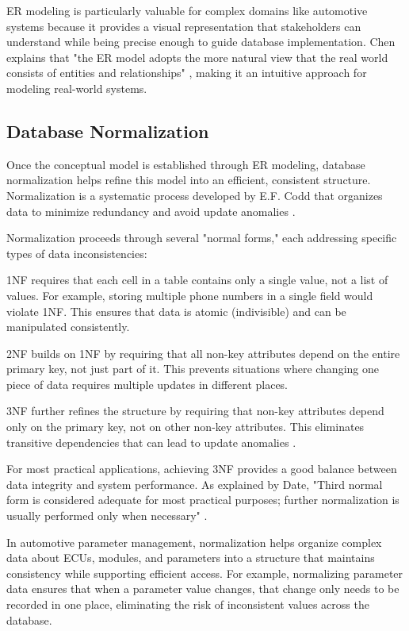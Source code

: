 \ac{ER} modeling is particularly valuable for complex domains like automotive systems because it provides a visual representation that stakeholders can understand while being precise enough to guide database implementation. Chen explains that "the \ac{ER} model adopts the more natural view that the real world consists of entities and relationships" \cite{chen1976entity}, making it an intuitive approach for modeling real-world systems.

\subsection{Database Normalization}
\label{subsec:database-normalization}

Once the conceptual model is established through \ac{ER} modeling, database normalization helps refine this model into an efficient, consistent structure. Normalization is a systematic process developed by E.F. Codd that organizes data to minimize redundancy and avoid update anomalies \cite{codd1970relational}.

Normalization proceeds through several "normal forms," each addressing specific types of data inconsistencies:

\ac{1NF} requires that each cell in a table contains only a single value, not a list of values. For example, storing multiple phone numbers in a single field would violate \ac{1NF}. This ensures that data is atomic (indivisible) and can be manipulated consistently.

\ac{2NF} builds on \ac{1NF} by requiring that all non-key attributes depend on the entire primary key, not just part of it. This prevents situations where changing one piece of data requires multiple updates in different places.

\ac{3NF} further refines the structure by requiring that non-key attributes depend only on the primary key, not on other non-key attributes. This eliminates transitive dependencies that can lead to update anomalies \cite{elmasri2015fundamentals}.

For most practical applications, achieving \ac{3NF} provides a good balance between data integrity and system performance. As explained by Date, "Third normal form is considered adequate for most practical purposes; further normalization is usually performed only when necessary" \cite{date2011sql}.

In automotive parameter management, normalization helps organize complex data about \acp{ECU}, modules, and parameters into a structure that maintains consistency while supporting efficient access. For example, normalizing parameter data ensures that when a parameter value changes, that change only needs to be recorded in one place, eliminating the risk of inconsistent values across the database.

